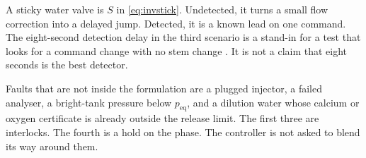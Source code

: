 A sticky water valve is $S$ in \eqref{eq:invstick}. Undetected, it turns a small flow correction into a delayed jump. Detected, it is a known lead on one command. The eight-second detection delay in the third scenario is a stand-in for a test that looks for a command change with no stem change \citep{jelali2010,choudhury2005}. It is not a claim that eight seconds is the best detector.

Faults that are not inside the formulation are a plugged injector, a failed analyser, a bright-tank pressure below $p_{\mathrm{eq}}$, and a dilution water whose calcium or oxygen certificate is already outside the release limit. The first three are interlocks. The fourth is a hold on the phase. The controller is not asked to blend its way around them.
